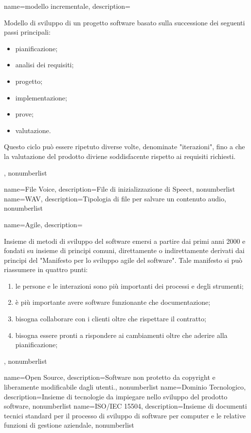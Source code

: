 {
	name={modello incrementale},
	description={Modello di sviluppo di un progetto software basato sulla successione dei seguenti passi principali:
	\begin{itemize}
    	\item pianificazione;
    	\item analisi dei requisiti;
   		\item progetto;
   		\item implementazione;
   		\item prove;
   		\item valutazione.
	\end{itemize}
	Questo ciclo può essere ripetuto diverse volte, denominate "iterazioni", fino a che la valutazione del prodotto diviene soddisfacente rispetto ai requisiti richiesti.},
	nonumberlist
}
{
	name={File Voice},
	description={File di inizializzazione di Speect},
	nonumberlist
}
{
	name={WAV},
	description={Tipologia di file per salvare un contenuto audio},
	nonumberlist
}
{
	name={Agile},
	description={Insieme di metodi di sviluppo del software emersi a partire dai
		primi anni 2000 e fondati su insieme di principi comuni, direttamente o
		indirettamente derivati dai principi del "Manifesto per lo sviluppo agile del
		software". Tale manifesto si può riassumere in quattro punti:
		\begin{enumerate}
			\item le persone e le interazioni sono più importanti dei processi e degli strumenti;
			\item è più importante avere software funzionante che documentazione;
			\item bisogna collaborare con i clienti oltre che rispettare il contratto;
			\item bisogna essere pronti a rispondere ai cambiamenti oltre che aderire alla pianificazione;
		\end{enumerate}
	},
	nonumberlist
}
{
	name={Open Source},
	description={Software non protetto da copyright e liberamente modificabile dagli utenti.},
	nonumberlist
}
{
	name={Dominio Tecnologico},
	description={Insieme di tecnologie da impiegare nello sviluppo del prodotto software},
	nonumberlist
}
{
	name={ISO/IEC 15504},
	description={Insieme di documenti tecnici standard per il processo di sviluppo di software per computer e le relative funzioni di gestione aziendale},
	nonumberlist
}
